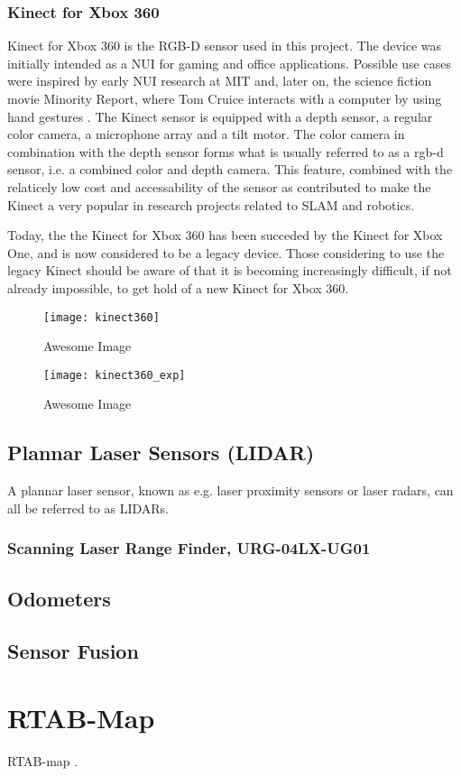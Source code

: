 \subsubsection{Kinect for Xbox 360}

Kinect for Xbox 360 is the RGB-D sensor used in this project. The device was initially intended as a \ac{NUI} for gaming and office applications. Possible use cases were inspired by early \ac{NUI} research at \ac{MIT} and, later on, the science fiction movie Minority Report, where Tom Cruice interacts with a computer by using hand gestures \cite{kinect_book}. The Kinect sensor is equipped with a depth sensor, a regular color camera, a microphone array and a tilt motor. The color camera in combination with the depth sensor forms what is usually referred to as a rgb-d sensor, i.e. a combined color and depth camera. This feature, combined with the relaticely low cost and accessability of the sensor as contributed to make the Kinect a very popular in research projects related to \ac{SLAM} and robotics.

Today, the the Kinect for Xbox 360 has been succeded by the Kinect for Xbox One, and is now considered to be a legacy device. Those considering to use the legacy Kinect should be aware of that it is becoming increasingly difficult, if not already impossible, to get hold of a new Kinect for Xbox 360. 

\begin{figure}[p]
    \centering
    \texttt{[image: kinect360]}
    \caption{Awesome Image}
    \label{fig:kinect360}
\end{figure}

\begin{figure}[p]
    \centering
    \texttt{[image: kinect360\_exp]}
    \caption{Awesome Image}
    \label{fig:kinect360_exp}
\end{figure}


\subsection{Plannar Laser Sensors (LIDAR)}

A plannar laser sensor, known as e.g. laser proximity sensors or laser radars, can all be referred to as LIDARs. 

\subsubsection{Scanning Laser Range Finder, URG-04LX-UG01}


\subsection{Odometers}

\subsection{Sensor Fusion}


\section{RTAB-Map}

\ac{RTAB-map} \cite{RTAB_map}.
